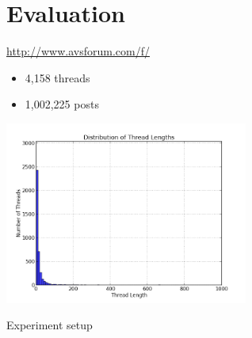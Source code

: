 \documentclass[12pt]{../presentation}
\begin{document}
\section{Evaluation}
	\begin{frame}{\url{http://www.avsforum.com/f/}}
		\begin{itemize}
			\item 	4,158 threads 		

			\item 1,002,225 posts 

		\end{itemize}
	\begin{center}
		\includegraphics[width=0.6\textwidth]{diagrams/len_dist.png}	
\end{center}
\end{frame}
	\begin{frame}{Experiment setup}
	~\\
	{\scriptsize
	
	}
	\end{frame}
\end{document}
